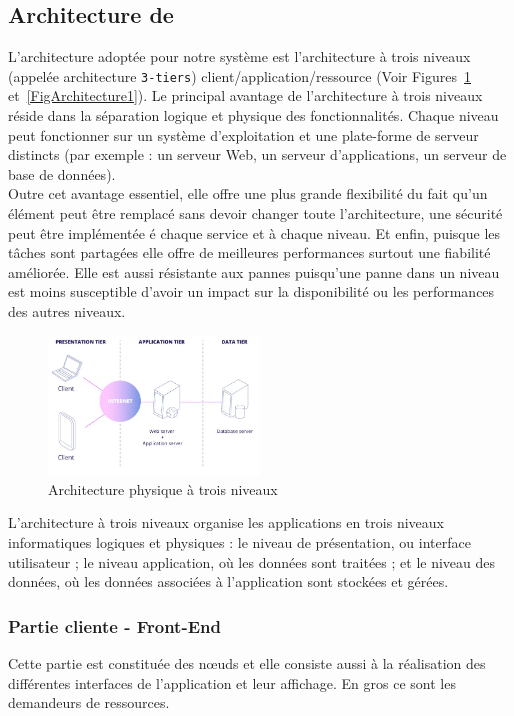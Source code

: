 \subsection{Architecture de \projectName}
L'architecture adopt\'ee pour notre syst\`eme est l'architecture \`a trois niveaux (appel\'ee architecture \texttt{3-tiers}) client/application/ressource (Voir Figures~\ref{FigArchitecture} et~\ref{FigArchitecture1}).  Le principal avantage de l'architecture \`a trois niveaux r\'eside dans la s\'eparation logique et physique des fonctionnalit\'es. Chaque niveau peut fonctionner sur un syst\`eme d'exploitation et une plate-forme de serveur distincts (par exemple : un serveur Web, un serveur d'applications, un serveur de base de donn\'ees).\\
Outre cet avantage essentiel, elle offre une plus grande flexibilit\'e du fait qu'un \'el\'ement peut \^etre remplac\'e sans devoir changer toute l'architecture, une s\'ecurit\'e peut \^etre impl\'ement\'ee \'e chaque service et \`a chaque niveau. Et enfin, puisque les t\^aches sont partag\'ees elle offre de meilleures performances surtout une fiabilit\'e am\'elior\'ee. Elle est aussi r\'esistante aux pannes puisqu'une panne dans un niveau est moins susceptible d'avoir un impact sur la disponibilit\'e ou les performances des autres niveaux.

	\begin{figure}[ht]
		\centering
		\includegraphics[width=0.5\textwidth]{Pictures/SystemStruct.png}
		\caption{Architecture physique \`a trois niveaux\cite{SourceFigArchitecture}}
		\label{FigArchitecture}
	\end{figure} 


L'architecture \`a trois niveaux organise les applications en trois niveaux informatiques logiques et physiques : le niveau de pr\'esentation, ou interface utilisateur ; le niveau application, o\`u les donn\'ees sont trait\'ees ; et le niveau des donn\'ees, o\`u  les donn\'ees associ\'ees \`a l'application sont stock\'ees et g\'er\'ees.
\subsubsection{Partie cliente - Front-End}
Cette partie est constitu\'ee des nœuds et elle consiste aussi \`a la r\'ealisation des diff\'erentes interfaces de l'application et leur affichage. En gros ce sont les demandeurs de ressources.

